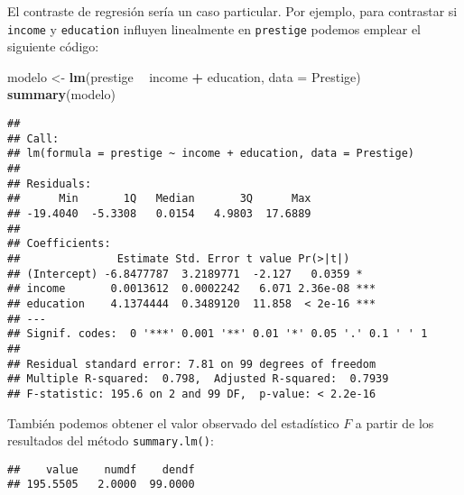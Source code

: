 \documentclass[
]{book}
\newenvironment{Shaded}{\begin{snugshade}}{\end{snugshade}}
\newcommand{\CommentTok}[1]{\textcolor[rgb]{0.56,0.35,0.01}{\textit{#1}}}
\newcommand{\DataTypeTok}[1]{\textcolor[rgb]{0.13,0.29,0.53}{#1}}
\newcommand{\DecValTok}[1]{\textcolor[rgb]{0.00,0.00,0.81}{#1}}
\newcommand{\KeywordTok}[1]{\textcolor[rgb]{0.13,0.29,0.53}{\textbf{#1}}}
\newcommand{\NormalTok}[1]{#1}
\newcommand{\OperatorTok}[1]{\textcolor[rgb]{0.81,0.36,0.00}{\textbf{#1}}}
\newcommand{\StringTok}[1]{\textcolor[rgb]{0.31,0.60,0.02}{#1}}
\theoremstyle{definition}
\theoremstyle{definition}
\theoremstyle{definition}
\theoremstyle{remark}
\begin{document}
El contraste de regresión sería un caso particular. Por ejemplo,
para contrastar si \texttt{income} y \texttt{education} influyen linealmente en \texttt{prestige}
podemos emplear el siguiente código:

\begin{Shaded}
\begin{Highlighting}[]
\NormalTok{modelo <-}\StringTok{ }\KeywordTok{lm}\NormalTok{(prestige }\OperatorTok{~}\StringTok{ }\NormalTok{income }\OperatorTok{+}\StringTok{ }\NormalTok{education, }\DataTypeTok{data =}\NormalTok{ Prestige)}
\KeywordTok{summary}\NormalTok{(modelo)}
\end{Highlighting}
\end{Shaded}

\begin{verbatim}
## 
## Call:
## lm(formula = prestige ~ income + education, data = Prestige)
## 
## Residuals:
##      Min       1Q   Median       3Q      Max 
## -19.4040  -5.3308   0.0154   4.9803  17.6889 
## 
## Coefficients:
##               Estimate Std. Error t value Pr(>|t|)    
## (Intercept) -6.8477787  3.2189771  -2.127   0.0359 *  
## income       0.0013612  0.0002242   6.071 2.36e-08 ***
## education    4.1374444  0.3489120  11.858  < 2e-16 ***
## ---
## Signif. codes:  0 '***' 0.001 '**' 0.01 '*' 0.05 '.' 0.1 ' ' 1
## 
## Residual standard error: 7.81 on 99 degrees of freedom
## Multiple R-squared:  0.798,  Adjusted R-squared:  0.7939 
## F-statistic: 195.6 on 2 and 99 DF,  p-value: < 2.2e-16
\end{verbatim}

También podemos obtener el valor observado del estadístico \(F\)
a partir de los resultados del método \texttt{summary.lm()}:

\begin{Shaded}
\end{Shaded}

\begin{verbatim}
##    value    numdf    dendf 
## 195.5505   2.0000  99.0000
\end{verbatim}
\end{document}
